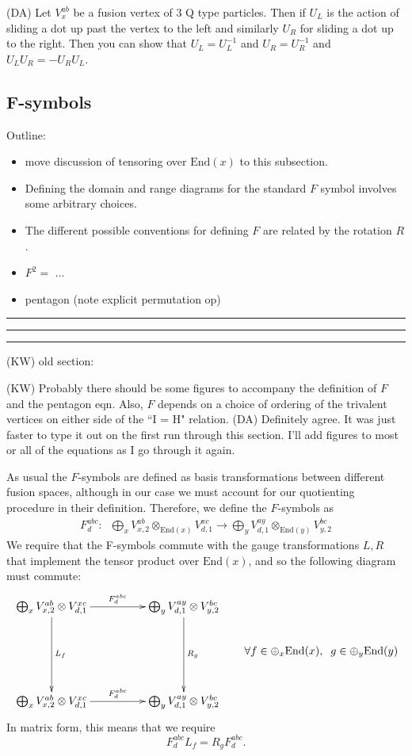 \documentclass[12pt,a4paper]{article}
\newcounter{arrow}
\newcommand{\tp}{\otimes}
\newcommand\be            {\begin{equation}}
\newcommand\ee            {\end{equation}}
\newcommand{\End}{\text{End}}
\newcommand{\dave}[1]{{\color{ao(english)}\footnotesize{(DA) #1}}}
\newcommand{\kw}[1]{{\color{kwcolor}\footnotesize{(KW) #1}}}
\newcommand{\kwsep}{\bigskip\hrule\medskip\hrule\medskip\hrule\bigskip}
\begin{document}
\dave{Let $V^{ab}_x$ be a fusion vertex of $3$ Q type particles. Then if $U_L$ is the action of sliding a dot up past the vertex to the left and similarly $U_R$ for sliding a dot up to the right. Then you can show that $U_L = U_L^{-1}$ and $U_R = U_R^{-1}$ and $U_L U_R = - U_R U_L$.}

\subsection{F-symbols}

Outline:
\begin{itemize}
\item move discussion of tensoring over $\End(x)$ to this subsection.
\item Defining the domain and range diagrams for the standard $F$ symbol involves some arbitrary choices.
\item The different possible conventions for defining $F$ are related by the rotation $R$.
\item $F^2 = $ ...
\item pentagon (note explicit permutation op)
\end{itemize}


\kwsep

\kw{old section:}



\kw{Probably there should be some figures to accompany the definition of $F$ and the pentagon eqn.
Also, $F$ depends on a choice of ordering of the trivalent vertices on either side of the ``I = H" relation.}
\dave{Definitely agree. It was just faster to type it out on the first run through this section. I'll add figures to most or all of the equations as I go through it again.}

As usual the $F$-symbols are defined as basis transformations between different fusion spaces, although in our case we must account for our quotienting procedure in their definition. Therefore, we define the $F$-symbols as
\begin{align}
F^{abc}_d: \; \; \bigoplus_x V^{ab}_{x,2} \tp_{\text{End}(x)} V^{xc}_{d,1} \rightarrow \bigoplus_y V^{ay}_{d,1} \tp_{\text{End}(y)} V^{bc}_{y,2}
\end{align}
We require that the F-symbols commute with the gauge transformations $L,R$ that implement the tensor product over $\End(x)$, and so the following diagram must commute:
\begin{align}
	\vcenter{\xymatrix @!0 @M=1mm @R=30mm @C=42mm{
		 \bigoplus_x V^{ab}_{x,2} \otimes V^{xc}_{d,1} \ar[d]^{L_{f}}\ar[r]^{F^{abc}_d}& \bigoplus_y V^{ay}_{d,1} \otimes V^{bc}_{y,2} \ar[d]^{R_{g}} \\
		\bigoplus_x V^{ab}_{x,2} \otimes V^{xc}_{d,1}  \ar[r]^{F^{abc}_d}  & \bigoplus_y V^{ay}_{d,1} \otimes V^{bc}_{y,2}	
	}} 
	{ \quad\quad \forall f \in \oplus_x \text{End}(x), \; \; g \in \oplus_y \text{End}(y)}
	\label{Fcommute}
\end{align}
In matrix form, this means that we require 
\be
F^{abc}_d  L_f=   R_g F^{abc}_d.
\ee
\end{document}
